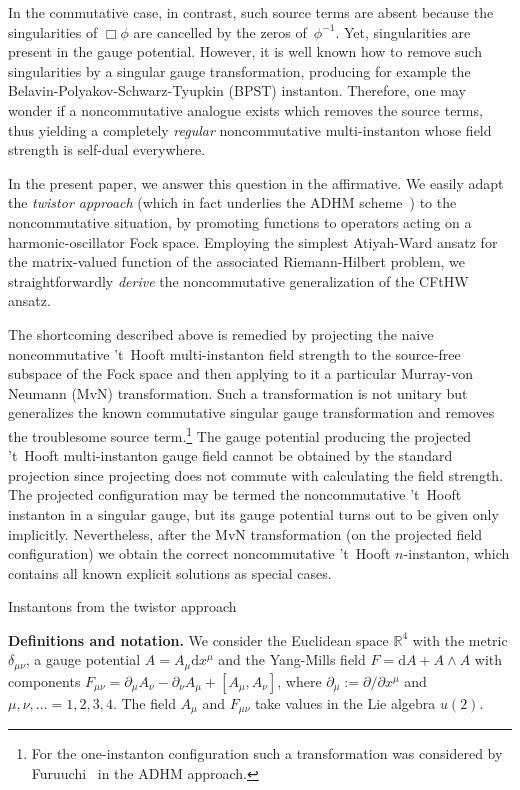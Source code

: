 \documentclass[a4paper,11pt]{article}
\makeatletter
\renewcommand{\section}{\@startsection{section}{1}{0pt}{\medskipamount}
{\medskipamount}{\large\bf}}
\numberwithin{equation}{section}
\def\de{\delta}
\newcommand{\R}{\mathbb R}
\def\pa{\mbox{$\partial$}}
\def\diff{\mbox{d}}
\makeatother
\begin{document}
In the commutative case, in contrast, such source terms are absent because
the singularities of $\Box\phi$ are cancelled by the zeros of~$\phi^{-1}$.
Yet, singularities are present in the gauge potential.
However, it is well known how to remove such singularities by a
singular gauge transformation, producing for example the
Belavin-Polyakov-Schwarz-Tyupkin (BPST) instanton.
Therefore, one may wonder if a noncommutative analogue exists
which removes the source terms, thus yielding a completely {\it regular\/} 
noncommutative multi-instanton whose field strength is self-dual everywhere.

In the present paper, we answer this question in the affirmative.
We easily adapt the {\it twistor approach\/} 
(which in fact underlies the ADHM scheme~\cite{Atiyah:1978ri}) 
to the noncommutative situation,
by promoting functions to operators acting on a harmonic-oscillator Fock space.
Employing the simplest Atiyah-Ward ansatz for the matrix-valued function of the
associated Riemann-Hilbert problem, we straightforwardly {\it derive\/} the 
noncommutative generalization of the CFtHW ansatz. 

The shortcoming described above is remedied by projecting the naive 
noncommutative 't~Hooft multi-instanton field strength to the source-free 
subspace of the Fock space and then applying to it a particular Murray-von 
Neumann (MvN) transformation. Such a transformation is not unitary 
but generalizes the known commutative singular gauge transformation
and removes the troublesome source term.\footnote{
For the one-instanton configuration such a transformation was considered
by Furuuchi~\cite{Furuuchi:2001vx} in the ADHM approach.}
The gauge potential producing the projected 't~Hooft multi-instanton gauge
field cannot be obtained by the standard projection since projecting does not
commute with calculating the field strength.
The projected configuration may be termed the noncommutative 't~Hooft 
instanton in a singular gauge, but its gauge potential turns out to be
given only implicitly. Nevertheless, after the MvN transformation (on the 
projected field configuration) we obtain the correct noncommutative 
't~Hooft $n$-instanton, which contains all known explicit solutions as 
special cases.


\section{Instantons from the twistor approach}

\noindent
{\bf Definitions and notation.} 
We consider the Euclidean space $\R^4$ with the metric
$\de_{\mu\nu}$, a gauge potential $A=A_{\mu}\diff x^\mu$ and the Yang-Mills 
field $F=\diff A+A\wedge A$ with components
 $F_{\mu\nu}=\pa_{\mu}A_{\nu}-\pa_{\nu}A_{\mu}+[A_{\mu},A_{\nu}]$,
where $\pa_{\mu} :=\pa /\pa x^\mu$ and $\mu,\nu,\ldots=1,2,3,4$. The field 
$A_{\mu}$ and $F_{\mu\nu}$ take values in the Lie algebra $u(2)$.
\end{document}

